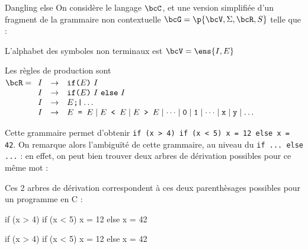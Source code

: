     \begin{example}{Dangling else}{}
        On considère le langage $\bcC$, et une version simplifiée d'un fragment de la grammaire non contextuelle $\bcG = \p{\bcV, \Sigma, \bcR, S}$ telle que :
        \begin{enumerate}
            \itt L'alphabet des symboles non terminaux est $\bcV = \ens{I, E}$
            
            \itt Les règles de production sont $\bcR = \begin{array}[t]{rcl}
                I &\rightarrow& \texttt{if(}E\texttt{)}\ I  \\
                I &\rightarrow& \texttt{if(}E\texttt{)}\ I \ \texttt{else}\ I\\
                I &\rightarrow& E\texttt{;|} \dots\\
                I &\rightarrow& E \texttt{ = } E \mid E \texttt{ < } E \mid E \texttt{ > } E \mid \dots \mid \texttt 0 \mid \texttt 1 \mid \dots \mid \texttt x \mid \texttt y \mid \dots
            \end{array}$
        \end{enumerate}
    
        Cette grammaire permet d'obtenir \texttt{if (x > 4) if (x < 5) x = 12 else x = 42}. On remarque alors l'ambiguïté de cette grammaire, au niveau du \texttt{if ... else ...} : en effet, on peut bien trouver deux arbres de dérivation possibles pour ce même mot :
        
        \begin{center}
            
        \end{center}
        
        Ces 2 arbres de dérivation correspondent à ces deux parenthèsages possibles pour un programme en \textsf{C} :
        
        \begin{minipage}{0.49\linewidth}
            \begin{C}
if (x > 4) {
    if (x < 5) x = 12
    else x = 42
}
            \end{C}
        \end{minipage}
        \hfill
        \begin{minipage}{0.49\linewidth}
            \begin{C}
if (x > 4) {
    if (x < 5) x = 12
} else x = 42

            \end{C}
        \end{minipage}
    \end{example}
    
